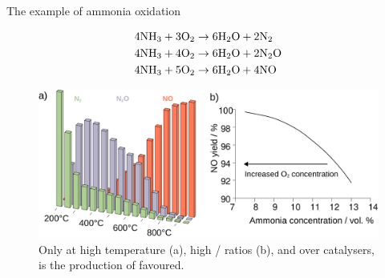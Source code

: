 \documentclass[final]{beamer}
\newlength{\colwidth}
\begin{document}
\begin{frame}[t]
\begin{columns}[t]
\begin{column}{\colwidth}
\begin{alertblock}{The example of ammonia oxidation}
    \vspace{-1cm}
               
        \begin{align}
            \label{eq:AmmoniaOxidationNitrogen}
            4 \ce{NH3} + 3 \ce{O2} & \rightarrow 6 \ce{H2O} + 2 \ce{N2} \\
            \label{eq:AmmoniaOxidationNitrousOxide}
            4 \ce{NH3} + 4 \ce{O2} & \rightarrow 6 \ce{H2O} + 2 \ce{N2O} \\
            \label{eq:AmmoniaOxidationNitricOxide}
            4 \ce{NH3} + 5 \ce{O2} & \rightarrow 6 \ce{H2O} + 4 \ce{NO}
        \end{align}
       
        \begin{figure}
            \centering
            \includegraphics[width=0.95\colwidth]{Figures/UmicoreSlides.pdf}
            \caption{Only at high temperature (a), high / ratios (b), and over catalysers, is the production of  favoured\cite{Hatscher2008}.}
            \label{fig:AmOxHatscher}
        \end{figure}
            

        \vspace{1cm}


\end{alertblock}
\end{column}
\end{columns}
\end{frame}
\end{document}

